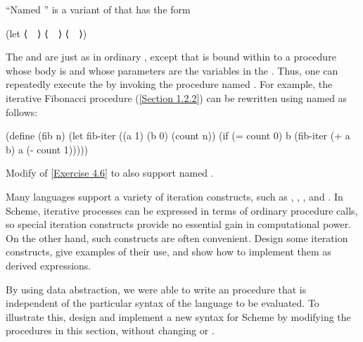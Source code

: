 \begin{exercise}
	\label{Exercise 4.8}
	“Named ” is a variant of  that has the form
	\begin{scheme}
		(let ⟨~~⟩ ⟨~~⟩ ⟨~~⟩)
	\end{scheme}
	The  and  are just as in ordinary , except that  is bound within  to a procedure whose body is  and whose parameters are the variables in the \code{⟨\var{bindings}⟩}.
	Thus, one can repeatedly execute the  by invoking the procedure named \code{⟨\var{var}⟩}.
	For example, the iterative Fibonacci procedure (\cref{Section 1.2.2}) can be rewritten using named  as follows:
	\begin{scheme}
	  (define (fib n)
	    (let fib-iter ((a 1)
	                   (b 0)
	                   (count n))
	      (if (= count 0)
	          b
	          (fib-iter (+ a b) a (- count 1)))))
	\end{scheme}
	Modify  of \cref{Exercise 4.6} to also support named .
\end{exercise}



\begin{exercise}
	\label{Exercise 4.9}
	Many languages support a variety of iteration constructs, such as , , , and .
	In Scheme, iterative processes can be expressed in terms of ordinary procedure calls, so special iteration constructs provide no essential gain in computational power.
	On the other hand, such constructs are often convenient.
	Design some iteration constructs, give examples of their use, and show how to implement them as derived expressions.
\end{exercise}



\begin{exercise}
	\label{Exercise 4.10}
	By using data abstraction, we were able to write an  procedure that is independent of the particular syntax of the language to be evaluated.
	To illustrate this, design and implement a new syntax for Scheme by modifying the procedures in this section, without changing  or .
\end{exercise}
